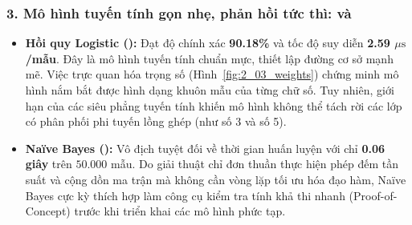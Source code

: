 \subsubsection{3. Mô hình tuyến tính gọn nhẹ, phản hồi tức thì:  và }
\begin{itemize}
    \item \textbf{Hồi quy Logistic ():} Đạt độ chính xác \textbf{90.18\%} và tốc độ suy diễn \textbf{2.59 $\mu\text{s}$/mẫu}. Đây là mô hình tuyến tính chuẩn mực, thiết lập đường cơ sở mạnh mẽ. Việc trực quan hóa trọng số (Hình~\ref{fig:2_03_weights}) chứng minh mô hình nắm bắt được hình dạng khuôn mẫu của từng chữ số. Tuy nhiên, giới hạn của các siêu phẳng tuyến tính khiến mô hình không thể tách rời các lớp có phân phối phi tuyến lồng ghép (như số 3 và số 5).
    \item \textbf{Naïve Bayes ():} Vô địch tuyệt đối về thời gian huấn luyện với chỉ \textbf{0.06 giây} trên $50.000$ mẫu. Do giải thuật chỉ đơn thuần thực hiện phép đếm tần suất và cộng dồn ma trận mà không cần vòng lặp tối ưu hóa đạo hàm, Naïve Bayes cực kỳ thích hợp làm công cụ kiểm tra tính khả thi nhanh (Proof-of-Concept) trước khi triển khai các mô hình phức tạp.
\end{itemize}

